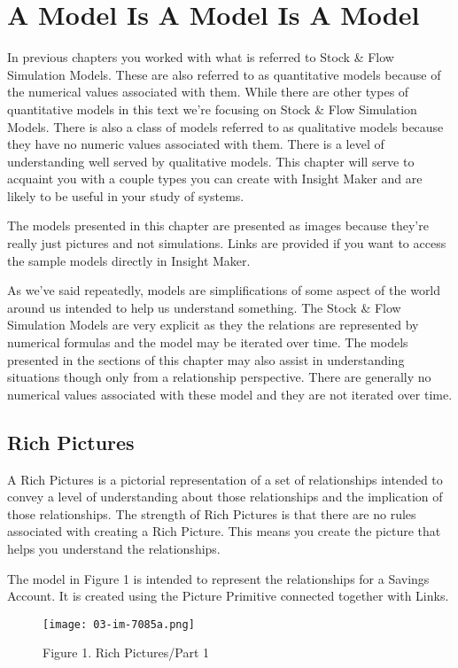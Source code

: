 \documentclass[]{memoir}
\let\Oldincludegraphics\includegraphics
\renewcommand{\includegraphics}[1]{\Oldincludegraphics[max size={\textwidth}{\textheight}]{#1}}
\begin{document}
\chapter{A Model Is A Model Is A Model}

In previous chapters you worked with what is referred to Stock \& Flow
Simulation Models. These are also referred to as quantitative models
because of the numerical values associated with them. While there are
other types of quantitative models in this text we're focusing on Stock
\& Flow Simulation Models. There is also a class of models referred to
as qualitative models because they have no numeric values associated
with them. There is a level of understanding well served by qualitative
models. This chapter will serve to acquaint you with a couple types you
can create with Insight Maker and are likely to be useful in your study
of systems.

The models presented in this chapter are presented as images because
they're really just pictures and not simulations. Links are provided if
you want to access the sample models directly in Insight Maker.

As we've said repeatedly, models are simplifications of some aspect of
the world around us intended to help us understand something. The Stock
\& Flow Simulation Models are very explicit as they the relations are
represented by numerical formulas and the model may be iterated over
time. The models presented in the sections of this chapter may also
assist in understanding situations though only from a relationship
perspective. There are generally no numerical values associated with
these model and they are not iterated over time.

\section{Rich Pictures}

A Rich Pictures is a pictorial representation of a set of relationships
intended to convey a level of understanding about those relationships
and the implication of those relationships. The strength of Rich
Pictures is that there are no rules associated with creating a Rich
Picture. This means you create the picture that helps you understand the
relationships.

The model in Figure 1 is intended to represent the relationships for a
Savings Account. It is created using the Picture Primitive connected
together with Links.

\begin{figure}[htbp]
\centering
\texttt{[image: 03-im-7085a.png]}
\caption{Figure 1. Rich Pictures/Part 1}
\end{figure}
\end{document}
